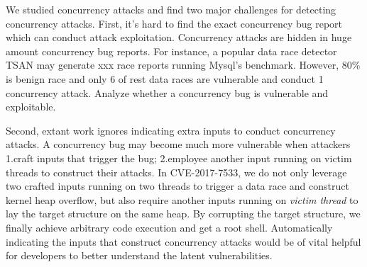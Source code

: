 We studied \nattacks concurrency attacks and find two major challenges for detecting concurrency attacks. 
First, it's hard to find the exact concurrency bug report which can conduct attack exploitation. 
Concurrency attacks are hidden in huge amount concurrency bug reports. 
For instance, a popular data race detector TSAN may generate xxx 
race reports running Mysql's benchmark. However, 80\% is benign race 
and only 6 of rest data races are vulnerable and conduct 1 concurrency attack. 
Analyze whether a concurrency bug is vulnerable and exploitable.
%


Second, extant work ignores indicating extra inputs to conduct concurrency attacks.
A concurrency bug may become much more vulnerable when attackers 1.craft inputs that trigger the bug; 
2.employee another input running on victim threads to construct their attacks. 
In CVE-2017-7533, we do not only leverage two crafted inputs running on two threads to trigger a data race and construct kernel heap overflow, 
but also require another inputs running on \emph{victim thread} to lay the target structure on the same heap. 
By corrupting the target structure, we finally achieve arbitrary code execution and get a root shell. 
Automatically indicating the inputs that construct concurrency attacks 
would be of vital helpful for developers to better understand the latent vulnerabilities.


